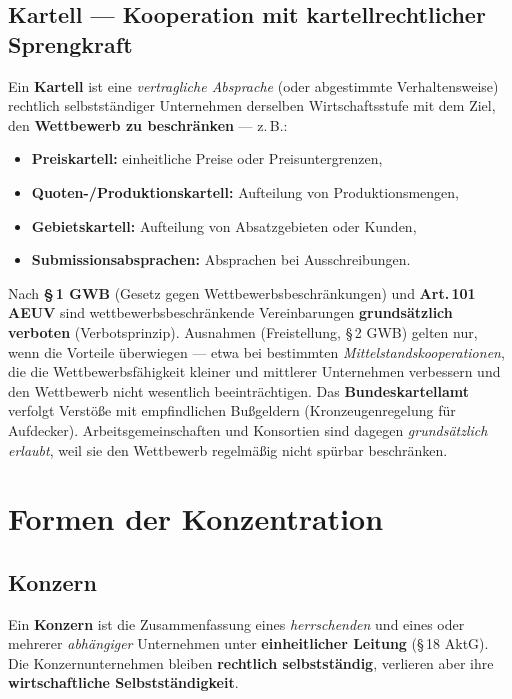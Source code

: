 \documentclass[11pt, a4paper]{article}
\begin{document}
\subsection{Kartell --- Kooperation mit kartellrechtlicher Sprengkraft}

Ein \textbf{Kartell} ist eine \emph{vertragliche Absprache} (oder abgestimmte
Verhaltensweise) rechtlich selbstständiger Unternehmen derselben Wirtschaftsstufe mit dem
Ziel, den \textbf{Wettbewerb zu beschränken} --- z.\,B.:

\begin{itemize}
  \item \textbf{Preiskartell:} einheitliche Preise oder Preisuntergrenzen,
  \item \textbf{Quoten-/Produktionskartell:} Aufteilung von Produktionsmengen,
  \item \textbf{Gebietskartell:} Aufteilung von Absatzgebieten oder Kunden,
  \item \textbf{Submissionsabsprachen:} Absprachen bei Ausschreibungen.
\end{itemize}

\begin{merksatz}[title={\bfseries Kartellrechtliche Einordnung (Verweis: VWL-Lektion 2)}]
Nach \textbf{\S\,1 GWB} (Gesetz gegen Wettbewerbsbeschränkungen) und
\textbf{Art.\,101 AEUV} sind wettbewerbsbeschränkende Vereinbarungen
\textbf{grundsätzlich verboten} (Verbotsprinzip). Ausnahmen (Freistellung, \S\,2 GWB)
gelten nur, wenn die Vorteile überwiegen --- etwa bei bestimmten
\emph{Mittelstandskooperationen}, die die Wettbewerbsfähigkeit kleiner und mittlerer
Unternehmen verbessern und den Wettbewerb nicht wesentlich beeinträchtigen. Das
\textbf{Bundeskartellamt} verfolgt Verstöße mit empfindlichen Bußgeldern
(Kronzeugenregelung für Aufdecker). Arbeitsgemeinschaften und Konsortien sind dagegen
\emph{grundsätzlich erlaubt}, weil sie den Wettbewerb regelmäßig nicht spürbar
beschränken.
\end{merksatz}

\section{Formen der Konzentration}

\subsection{Konzern}

Ein \textbf{Konzern} ist die Zusammenfassung eines \emph{herrschenden} und eines oder
mehrerer \emph{abhängiger} Unternehmen unter \textbf{einheitlicher Leitung}
(\S\,18 AktG). Die Konzernunternehmen bleiben \textbf{rechtlich selbstständig}, verlieren
aber ihre \textbf{wirtschaftliche Selbstständigkeit}.
\end{document}
